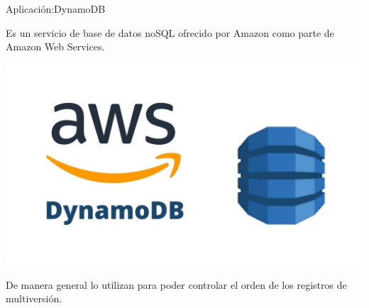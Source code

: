 \begin{frame}[fragile]{Aplicación:}{DynamoDB}
    \justifying

Es un servicio de base de datos noSQL ofrecido por Amazon como parte de\\
Amazon Web Services.

\begin{center}
    \includegraphics[scale=0.15]{D.jpg}
    \end{center}

De manera general lo utilizan para poder controlar el orden de los registros
de multiversión.

\end{frame}
